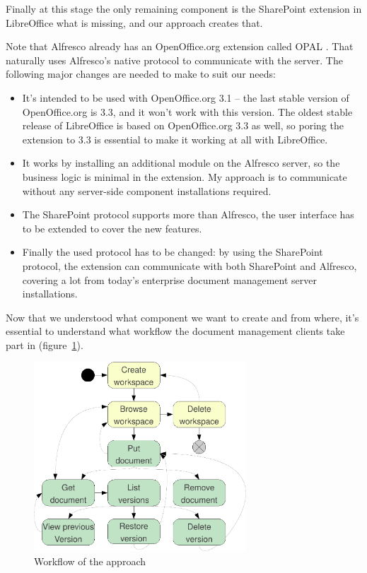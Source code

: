 Finally at this stage the only remaining component is the SharePoint extension
in LibreOffice what is missing, and our approach creates that.

Note that Alfresco already has an OpenOffice.org extension called
OPAL \cite{opal}. That naturally uses Alfresco's native protocol to communicate
with the server. The following major changes are needed to make to suit our
needs:

\begin{itemize}
\item It's intended to be used with OpenOffice.org 3.1 -- the last stable
version of OpenOffice.org is 3.3, and it won't work with this version. The
oldest stable release of LibreOffice is based on OpenOffice.org 3.3 as well, so
poring the extension to 3.3 is essential to make it working at all with
LibreOffice.
\item It works by installing an additional module on the Alfresco server, so
the business logic is minimal in the extension. My approach is to communicate
without any server-side component installations required.
\item The SharePoint protocol supports more than Alfresco, the user interface
has to be extended to cover the new features.
\item Finally the used protocol has to be changed: by using the SharePoint
protocol, the extension can communicate with both SharePoint and Alfresco,
covering a lot from today's enterprise document management server
installations.
\end{itemize}

Now that we understood what component we want to create and from where, it's
essential to understand what workflow the document management clients take part
in (figure~\ref{fig:overview-workflow}).

\begin{figure}[H]
\centering
\includegraphics[width=300px,keepaspectratio]{overview-workflow.pdf}
\caption{Workflow of the approach}
\label{fig:overview-workflow}
\end{figure}

